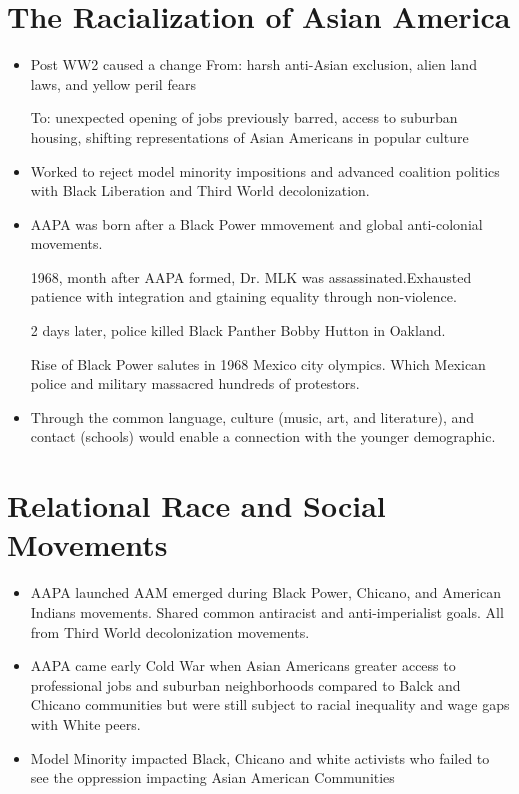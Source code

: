 \documentclass{article}
\begin{document}
\section*{The Racialization of Asian America}
\begin{itemize}
  \item Post WW2 caused a change 
    From: harsh anti-Asian exclusion, alien land laws, and yellow peril fears

    To: unexpected opening of jobs previously barred, access to
    suburban housing, shifting representations of Asian Americans in popular culture

  \item Worked to reject model minority impositions and advanced coalition politics with
    Black Liberation and Third World decolonization.
  \item AAPA was born after a Black Power mmovement and global
    anti-colonial movements.

    1968, month after AAPA formed, Dr. MLK was assassinated.Exhausted patience 
    with integration and gtaining equality through non-violence.

    2 days later, police killed Black Panther Bobby Hutton in Oakland.

    Rise of Black Power salutes in 1968 Mexico city olympics.
    Which Mexican police and military massacred hundreds of protestors.

  \item Through the common language, culture 
    (music, art, and literature),
    and contact (schools) would enable a connection with the younger 
    demographic.

\end{itemize}

\section*{Relational Race and Social Movements}
\begin{itemize}
  \item AAPA launched AAM emerged during Black Power, Chicano, and American Indians
    movements. Shared common antiracist and anti-imperialist goals. All
    from Third World decolonization movements.
  \item AAPA came early Cold War when Asian Americans greater access
    to professional jobs and suburban neighborhoods compared to Balck and Chicano communities
    but were still subject to racial inequality and wage gaps with White peers.
  \item Model Minority impacted Black, Chicano and white activists 
    who failed to see the oppression impacting Asian American Communities
\end{itemize}
\end{document}
